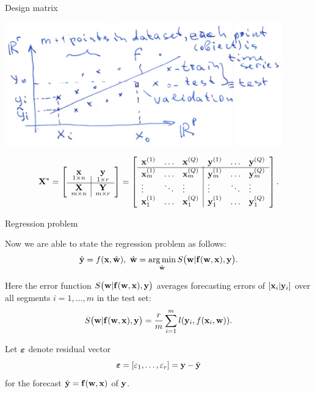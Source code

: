 \documentclass{beamer}
\begin{document}
\begin{frame}{Design matrix}


\includegraphics[width=0.9\textwidth]{forecasting_model.png}

\[
{\mathbf{X}}^*= \left[
\begin{array}{c|c}
\underset{1{\times}n}{{\mathbf{x}}} & \underset{1{\times}r}{{{\mathbf{y}}}}  \\
\hline
 \underset{m{\times}n}{{\mathbf{X}}} & \underset{m{\times}r}{\mathbf{Y}}  \\
 \end{array}
\right] =  \left[
\begin{array}{lll|lll}
{\mathbf{x}}^{(1)} & \dots & {\mathbf{x}}^{(Q)} & {\mathbf{y}}^{(1)} &  \dots & {{\mathbf{y}}}^{(Q)}   \\
\hline
{\mathbf{x}}_m^{(1)}  & \dots & {\mathbf{x}}_m^{(Q)} & {\mathbf{y}}_m^{(1)} &  \dots & {\mathbf{y}}_m^{(Q)}   \\
\vdots & \ddots & \vdots & \vdots & \ddots & \vdots  \\
{\mathbf{x}}_1^{(1)} & \dots & {\mathbf{x}}_1^{(Q)} & {\mathbf{y}}_1^{(1)}  & \dots & {\mathbf{y}}_1^{(Q)}   \\


\end{array}
\right]. \]


\end{frame}
\begin{frame}{Regression problem}

Now we are able to state the regression problem as follows:
\begin{equation}\label{eq:regression_problem}
\hat{\y} = f(\x, \hat{\w}), ~\hat{\w} = \argmin_{\hat{\w}}S\bigl(\bw|\fx(\bw,\bx),\by\bigr). %
\end{equation}

Here the error function $S\bigl(\mathbf{w}|{\mathbf{f}}(\mathbf{w},{\mathbf{x}}),{\mathbf{y}}\bigr)$ averages forecasting errors of  $[{\mathbf{x}}_i | {\mathbf{y}}_i]$  over all segments $i = 1, \dots, m$ in the test set:
\[ S\bigl(\mathbf{w}|{\mathbf{f}}(\mathbf{w},{\mathbf{x}}),{\mathbf{y}}\bigr) = \frac{r}{m}\sum_{i=1}^{m} l({\mathbf{y}}_i, f({\mathbf{x}}_i, {\mathbf{w}})).\]

Let ${\boldsymbol{\varepsilon}}$ denote residual vector
\[ {\boldsymbol{\varepsilon}} = [\varepsilon_1, \dots, \varepsilon_r] = {\mathbf{y}} - \hat{{\mathbf{y}}}\]
for the forecast $\hat{{\mathbf{y}}} = {\mathbf{f}}(\mathbf{w},{\mathbf{x}})$ of ${\mathbf{y}}$.


\end{frame}
\end{document}
